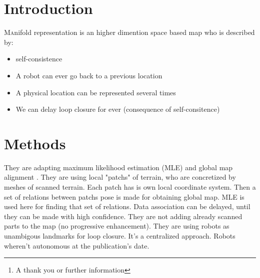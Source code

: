 \documentclass[twoside,twocolumn]{article}
\title{\citetitle{howard_multirobot_2006}} %
\author{%
\textsc{Virgile Daugé}\thanks{A thank you or further information} \\[1ex] %
\normalsize University of Lorraine \\ %
\normalsize \href{mailto:virgile.dauge@inria.fr}{virgile.dauge@inria.fr} %
}
\date{\today} %
\begin{document}
\maketitle


\section{Introduction}

\lettrine[nindent=0em,lines=3]{M}anifold representation is an higher dimention space based map who is described by:
\begin{itemize}
  \item self-consistence
  \item A robot can ever go back to a previous location
  \item A physical location can be represented several times
  \item We can delay loop closure for ever (consequence of self-consitence)
\end{itemize}


\section{Methods}
They are adapting maximum likelihood estimation (MLE) \cite{lu_globally_1997,gutmann_incremental_1999} and global map alignment \cite{lu_globally_1997}.
They are using local "patchs" of terrain, who are concretized by meshes of scanned terrain.
Each patch has is own local coordinate system.
Then a set of relations between patchs pose is made for obtaining global map.
MLE is used here for finding that set of relations.
Data association can be delayed, until they can be made with high confidence.
They are not adding already scanned parts to the map (no progressive enhancement).
They are using robots as unambigous landmarks for loop closure.
It's a centralized approach. Robots wheren't autonomous at the publication's date.


\end{document}
